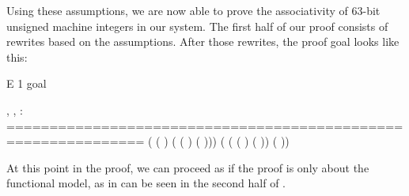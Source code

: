 Using these assumptions, we are now able to prove the associativity of 63-bit unsigned machine integers in our system. The first half of our proof consists of rewrites based on the \modelspec{} assumptions. After those rewrites, the proof goal looks like this:

\vspace{.2in}

\begin{SaveVerbatim}{E}
1 goal
  
, ,  : 
==============================================================
 ( ( )
                  ( ( ) ( ))) \ty{=}
 ( ( ( ) ( ))
                  ( ))
\end{SaveVerbatim}

At this point in the proof, we can proceed as if the proof is only about the \gls{functional model}, as in can be seen in the second half of .